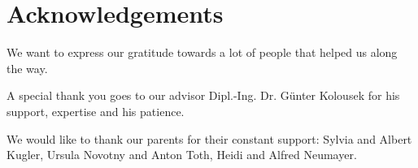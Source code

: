\chapter{Acknowledgements}

We want to express our gratitude towards a lot of people that helped us along the way.

A special thank you goes to our advisor Dipl.-Ing. Dr. Günter Kolousek for his support, expertise and his patience.

We would like to thank our parents for their constant support: Sylvia and Albert Kugler, Ursula Novotny and Anton Toth, Heidi and Alfred Neumayer.
